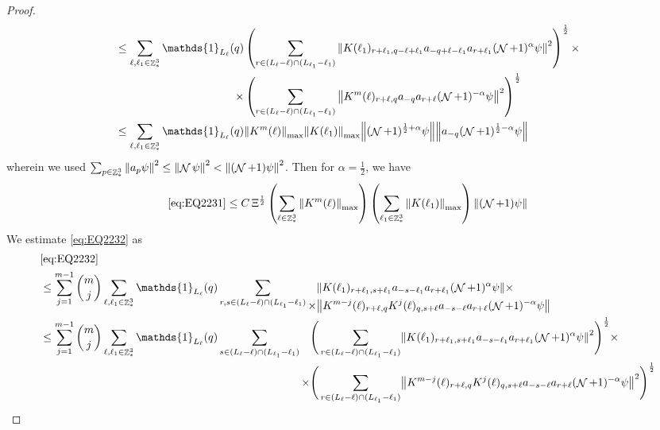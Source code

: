 \documentclass[sn-mathphys, Numbered ,a4paper]{sn-jnl}%
\DeclareMathOperator{\Z}{\mathbb{Z}}
\DeclareMathOperator{\NN}{\mathcal{N}}
\newcommand{\half}{\frac{1}{2}}
\theoremstyle{plain}
\theoremstyle{definition}
\theoremstyle{remark}
\theoremstyle{plain}
\theoremstyle{definition}
\theoremstyle{remark}
\begin{document}
{\begin{proof}
\begin{align}
		&\leq \sum\limits_{\ell, \ell_1\in \Z^3_*} \begin{aligned}[t] \mathds{1}_{L_{\ell}}(q)  &\left(\sum\limits_{r\in(L_{\ell}-\ell) \cap (L_{\ell_1}-\ell_1)} \norm{ K(\ell_1)_{r+\ell_1,q-\ell+\ell_1} a_{-q+\ell-\ell_1} a_{r+\ell_1} (\NN+1)^{\alpha}\psi}^2 \right)^\half \times \nonumber\\ \times &\left(\sum\limits_{r\in(L_{\ell}-\ell) \cap (L_{\ell_1}-\ell_1)} \norm{ K^m(\ell)_{r+\ell,q} a_{-q}a_{r+\ell} (\NN+1)^{-\alpha} \psi }^2\right)^\half \end{aligned}\nonumber\\
		&\leq \sum\limits_{\ell, \ell_1\in \Z^3_*} \mathds{1}_{L_{\ell}}(q)   \norm{K^m(\ell)}_{\mathrm{max}} \norm{ K(\ell_1)}_{\mathrm{max}} \norm{ (\NN+1)^{\half+\alpha}\psi}\norm{ a_{-q} (\NN+1)^{\half-\alpha} \psi }\nonumber\\
	\end{align} 
	wherein we used $\sum_{p\in \Z^3_*}\norm{a_p \psi}^2\leq\norm{\NN\psi}^2<\norm{(\NN+1)\psi}^2$. Then for $\alpha =  \half $, we have 
	\begin{equation}
		\eqref{eq:EQ2231}\leq C\, \Xi^\half \left(\sum\limits_{\ell\in \Z^3_*} \norm{K^m(\ell)}_{\mathrm{max}}\right)\left(  \sum\limits_{ \ell_1\in \Z^3_*}  \norm{ K(\ell_1)}_{\mathrm{max}} \right) \norm{ (\NN+1) \psi}\label{eq:estEQ2231} 
	\end{equation}  
	We estimate \eqref{eq:EQ2232} as
	\begin{align}
		&\eqref{eq:EQ2232}\nonumber\\
		&\leq \sum\limits_{j=1}^{m-1} {{m}\choose j} \sum\limits_{\ell, \ell_1\in \Z^3_*}\mathds{1}_{L_{\ell}}(q) \sum\limits_{r, s \in (L_{\ell}-\ell) \cap (L_{\ell_1}-\ell_1)} \begin{aligned}[t] &\norm{ K(\ell_1)_{r+\ell_1,s+\ell_1}a_{-s-\ell_1} a_{r+\ell_1} (\NN+1)^{\alpha}\psi}\nonumber \times \\ \times&\norm{ K^{m-j}(\ell)_{r+\ell,q} K^{j}(\ell)_{q,s+\ell} a_{-s-\ell}a_{r+\ell} (\NN+1)^{-\alpha} \psi }\end{aligned} \nonumber\\
		&\leq \sum\limits_{j=1}^{m-1} {{m}\choose j} \sum\limits_{\ell, \ell_1\in \Z^3_*} \mathds{1}_{L_{\ell}}(q) \sum\limits_{s\in(L_{\ell}-\ell) \cap (L_{\ell_1}-\ell_1)}   \begin{aligned}[t] \Bigg(\sum\limits_{ r \in (L_{\ell}-\ell) \cap (L_{\ell_1}-\ell_1)}&\norm{ K(\ell_1)_{r+\ell_1,s+\ell_1}a_{-s-\ell_1} a_{r+\ell_1} (\NN+1)^{\alpha}\psi}^2\Bigg)^\half\nonumber \times \\ \times\Bigg(  \sum\limits_{ r \in (L_{\ell}-\ell) \cap (L_{\ell_1}-\ell_1)}&\norm{ K^{m-j}(\ell)_{r+\ell,q} K^{j}(\ell)_{q,s+\ell} a_{-s-\ell}a_{r+\ell} (\NN+1)^{-\alpha} \psi }^2\Bigg)^\half\end{aligned} \nonumber\\

\end{align}
\end{proof}}
\end{document}
